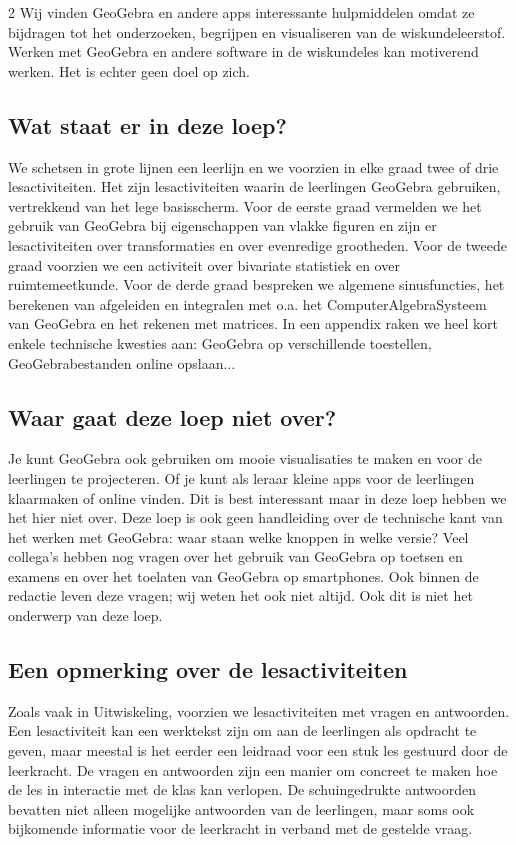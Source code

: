 \begin{multicols}{2}
  Wij vinden GeoGebra en andere apps interessante hulpmiddelen omdat ze bijdragen tot het onderzoeken, begrijpen en visualiseren van de wiskundeleerstof. Werken met GeoGebra en andere software in de wiskundeles kan motiverend werken. Het is echter geen doel op zich. 

\subsection*{Wat staat er in deze loep?}
 We schetsen in grote lijnen een leerlijn en we voorzien in elke graad twee of drie lesactiviteiten. Het zijn lesactiviteiten waarin de leerlingen GeoGebra gebruiken, vertrekkend van het lege basisscherm. Voor de eerste graad vermelden we het gebruik van GeoGebra bij eigenschappen van vlakke figuren en zijn er lesactiviteiten over transformaties en over evenredige grootheden. Voor de tweede graad voorzien we een activiteit over bivariate statistiek en over ruimtemeetkunde. Voor de derde graad bespreken we algemene sinusfuncties, het berekenen van afgeleiden en integralen met o.a. het ComputerAlgebraSysteem van GeoGebra en het rekenen met matrices. In een appendix raken we heel kort enkele technische kwesties aan: GeoGebra op verschillende toestellen, GeoGebrabestanden online opslaan...

 \subsection*{Waar gaat deze loep niet over?}
 Je kunt GeoGebra ook gebruiken om mooie visualisaties te maken en voor de leerlingen te projecteren. Of je kunt als leraar kleine apps voor de leerlingen klaarmaken of online vinden. Dit is best interessant maar in deze loep hebben we het hier niet over.   Deze loep is ook geen handleiding over de technische kant van het werken met GeoGebra: waar staan welke knoppen in welke versie? Veel collega's hebben nog vragen over het gebruik van GeoGebra op toetsen en examens en over het toelaten van GeoGebra op smartphones. Ook binnen de redactie leven deze vragen; wij weten het ook niet altijd. Ook dit is niet het onderwerp van deze loep. 

 \subsection*{Een opmerking over de lesactiviteiten}
 Zoals vaak in Uitwiskeling, voorzien we lesactiviteiten met vragen en antwoorden. Een lesactiviteit kan een werktekst zijn om aan de leerlingen als opdracht te geven, maar meestal is het eerder een leidraad voor een stuk les gestuurd door de leerkracht. De vragen en antwoorden zijn een manier om concreet te maken hoe de les in interactie met de klas kan verlopen. De schuingedrukte antwoorden bevatten niet alleen mogelijke antwoorden van de leerlingen, maar soms ook bijkomende informatie voor de leerkracht in verband met de gestelde vraag.

\end{multicols}
